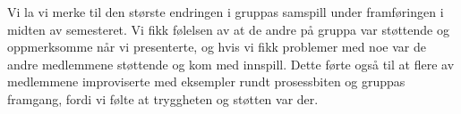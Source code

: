 Vi la vi merke til den største endringen i gruppas samspill under framføringen i midten av
semesteret. Vi fikk følelsen av at de andre på gruppa var støttende og
oppmerksomme når vi presenterte, og hvis vi fikk problemer med noe var de andre
medlemmene støttende og kom med innspill. Dette førte også til at flere av
medlemmene improviserte med eksempler rundt prosessbiten og gruppas framgang,
fordi vi følte at tryggheten og støtten var der.

